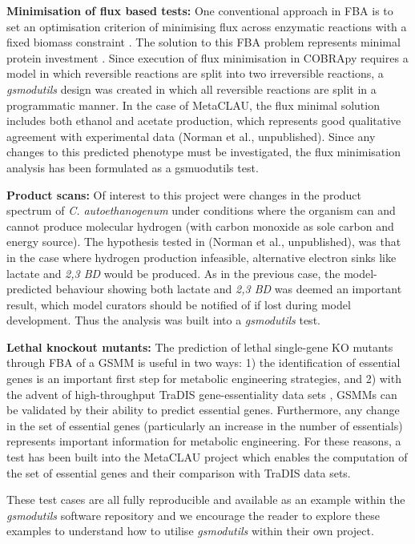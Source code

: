 \documentclass[journal=asbcd6,10pt]{achemso}
\begin{document}
\textbf{Minimisation of flux based tests:}
One conventional approach in FBA is to set an optimisation criterion of minimising flux across enzymatic reactions with a fixed biomass constraint \cite{holzhutter2006thegeneralised}. 
The solution to this FBA problem represents minimal protein investment \cite{holzhutter2006thegeneralised}.
Since execution of flux minimisation in COBRApy requires a model in which reversible reactions are split into two irreversible reactions, a \textit{gsmodutils} design was created in which all reversible reactions are split in a programmatic manner.
In the case of MetaCLAU, the flux minimal solution includes both ethanol and acetate production, which represents good qualitative agreement with experimental data (Norman et al., unpublished).
Since any changes to this predicted phenotype must be investigated, the flux minimisation analysis has been formulated as a gsmuodutils test.

\textbf{Product scans:}
Of interest to this project were changes in the product spectrum of \textit{C. autoethanogenum} under conditions where the organism can and cannot produce molecular hydrogen (with carbon monoxide as sole carbon and energy source).
The hypothesis tested in (Norman et al., unpublished), was that in the case where hydrogen production infeasible, alternative electron sinks like lactate and \textit{2,3 BD} would be produced.
As in the previous case, the model-predicted behaviour showing both lactate and \textit{2,3 BD} was deemed an important result, which model curators should be notified of if lost during model development.
Thus the analysis was built into a \textit{gsmodutils} test.

\textbf{Lethal knockout mutants:} 
The prediction of lethal single-gene KO mutants through FBA of a GSMM is useful in two ways: 
1) the identification of essential genes is an important first step for metabolic engineering strategies, 
and 2) with the advent of high-throughput TraDIS gene-essentiality data sets \cite{langridge2009simultaneous}, GSMMs can be validated by their ability to predict essential genes.
Furthermore, any change in the set of essential genes (particularly an increase in the number of essentials) represents important information for metabolic engineering.
For these reasons, a test has been built into the MetaCLAU project which enables the computation of the set of essential genes and their comparison with TraDIS data sets.

These test cases are all fully reproducible and available as an example within the \textit{gsmodutils} software repository and we encourage the reader to explore these examples to understand how to utilise \textit{gsmodutils} within their own project.
\end{document}
